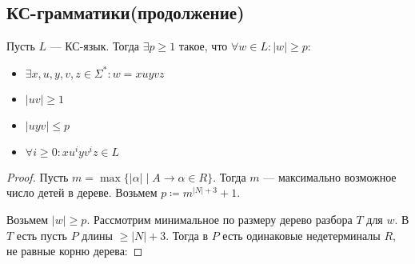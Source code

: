 \subsection{КС-грамматики(продолжение)}
\begin{lemma}[о накачке]
  Пусть $L$ --- КС-язык. Тогда $\exists p \geq 1$ такое, что $\forall w \in L\colon |w| \geq p$:
  \begin{itemize}
    \item $\exists x, u, y, v, z \in \Sigma^{*}\colon w = x u y v z$
    \item $|uv| \geq 1$
    \item $|uyv| \leq p$
    \item $\forall i \geq 0\colon xu^iyv^iz \in L$
  \end{itemize}
\end{lemma}
\begin{proof} Пусть $m = \max \{|\alpha| \; | \; A \to \alpha \in R\}$. Тогда $m$ --- максимально возможное число детей в дереве. Возьмем $p \coloneqq m^{|N| + 3} + 1$. 

Возьмем $|w| \geq p$. Рассмотрим минимальное по размеру дерево разбора $T$ для $w$. В $T$ есть пусть $P$ длины $\geq |N| + 3$. Тогда в $P$ есть одинаковые недетерминалы $R$, не равные корню дерева:


\center
\begin{tikzpicture}[x=0.75pt,y=0.75pt,yscale=-1,xscale=1]


\end{tikzpicture}
\end{proof}
